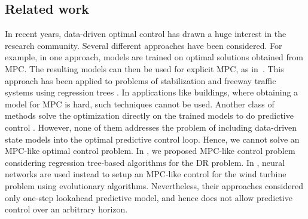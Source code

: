 \subsection{Related work}
\label{sec:related}
In recent years, data-driven optimal control has drawn a huge interest in the research community.
Several different approaches have been considered. 
For example, in one approach, models are trained on optimal solutions obtained from MPC. 
The resulting models can then be used for explicit MPC, as in~\cite{BemporadMorariDuaEtAl2002}. This approach has been applied to problems of stabilization \cite{CavagnariMagniScattolini1999} and freeway traffic systems using regression trees \cite{OleariFrejoCamachoEtAl2015}. 
In applications like buildings, where obtaining a model for MPC is hard, such techniques cannot be used.
Another class of methods solve the optimization directly on the trained models to do predictive control \cite{Hou2013,Costanzo2016,FerreiraRuanoSilvaEtAl2012}. 
However, none of them addresses the problem of including data-driven state models into the optimal predictive control loop. Hence, we cannot solve an MPC-like optimal control problem. 
In \cite{Behl201630}, we proposed MPC-like control problem considering regression tree-based algorithms for the DR problem. In \cite{KusiakSongZheng2009}, neural networks are used instead to setup an MPC-like control for the wind turbine problem using evolutionary algorithms. Nevertheless, their approaches considered only one-step lookahead predictive model, and hence does not allow predictive control over an arbitrary horizon.

